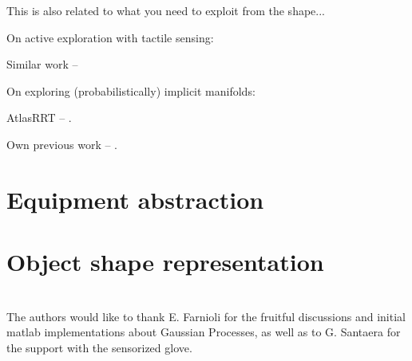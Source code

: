 \documentclass[twocolumn,draft,natbib]{svjour3}
\begin{document}
This is also related to what you need to exploit from the shape...

On active exploration with tactile sensing:

Similar work -- \citet{Bjorkman2013Enhancing}

On exploring (probabilistically) implicit manifolds:

AtlasRRT -- \citet{Jaillet2013Path}.

Own previous work -- \citet{Rosales2014Active}.

\section{Equipment abstraction}
\label{sec:equipment}

\section{Object shape representation}
\label{sec:object}


\section{}
\label{sec:equipment}

\begin{acknowledgements}
The authors would like to thank E. Farnioli for the fruitful discussions and 
initial matlab implementations about Gaussian Processes, as well as to G. 
Santaera for the support with the sensorized glove.
\end{acknowledgements}



\end{document}
